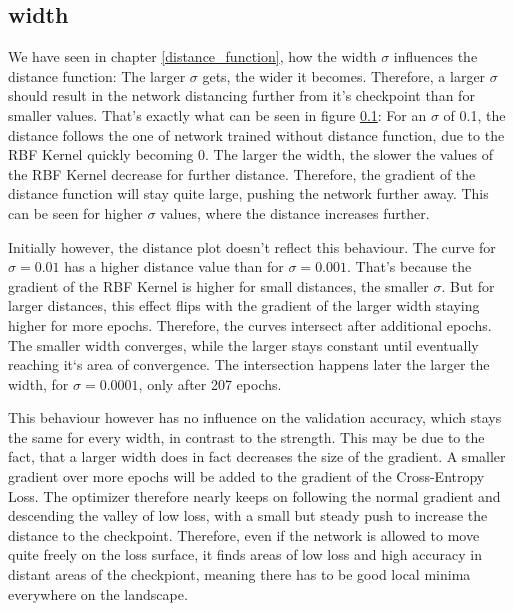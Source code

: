 \subsection{width}
We have seen in chapter \ref{distance_function}, how the width $\sigma$
influences the distance function: The larger $\sigma$ gets, the wider it
becomes. Therefore, a larger $\sigma$ should result in the network distancing
further from it's checkpoint than for smaller values. That's exactly what can be
seen in figure \ref{}: For an $\sigma$ of 0.1, the distance follows the one of
network trained without distance function, due to the RBF Kernel quickly
becoming 0. The larger the width, the slower the values of the RBF Kernel
decrease for further distance. Therefore, the gradient of the distance function
will stay quite large, pushing the network further away. This can be seen for
higher $\sigma$ values, where the distance increases further.


Initially however, the distance plot doesn't reflect this behaviour. The curve
for $\sigma = 0.01$ has a higher distance value than for $\sigma = 0.001$.
That's because the gradient of the RBF Kernel is higher for small distances, the
smaller $\sigma$. But for larger distances, this effect flips with the gradient
of the larger width staying higher for more epochs. Therefore, the curves
intersect after additional epochs. The smaller width converges, while the larger
stays constant until eventually reaching it`s area of convergence. The
intersection happens later the larger the width, for $\sigma = 0.0001$, only
after 207 epochs.

This behaviour however has no influence on the validation accuracy, which stays
the same for every width, in contrast to the strength. This may be due to the
fact, that a larger width does in fact decreases the size of the gradient. A
smaller gradient over more epochs will be added to the gradient of the
Cross-Entropy Loss. The optimizer therefore nearly keeps on following the normal
gradient and descending the valley of low loss, with a small but steady push to
increase the distance to the checkpoint. Therefore, even if the network is
allowed to move quite freely on the loss surface, it finds areas of low loss and
high accuracy in distant areas of the checkpiont, meaning there has to be good
local minima everywhere on the landscape.










